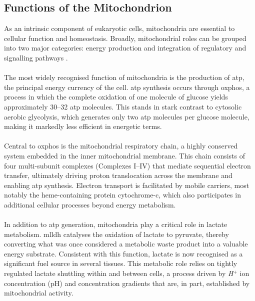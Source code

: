 \subsection{Functions of the Mitochondrion}

As an intrinsic component of eukaryotic cells, mitochondria are essential to cellular function and homeostasis. Broadly, mitochondrial roles can be grouped into two major categories: energy production and integration of regulatory and signalling pathways \cite{casanova_mitochondria_2023}.
\\
\\
The most widely recognised function of mitochondria is the production of \gls{atp}, the principal energy currency of the cell\cite{casanova_mitochondria_2023}. \gls{atp} synthesis occurs through \gls{oxphos}, a process in which the complete oxidation of one molecule of glucose yields approximately 30–32 \gls{atp} molecules\cite{casanova_mitochondria_2023, harrington_mitochondria_2023, andrieux_mitochondria_2021}. This stands in stark contrast to cytosolic aerobic glycolysis, which generates only two \gls{atp} molecules per glucose molecule, making it markedly less efficient in energetic terms\cite{casanova_mitochondria_2023}.
\\
\\
Central to \gls{oxphos} is the mitochondrial respiratory chain, a highly conserved system embedded in the inner mitochondrial membrane\cite{casanova_mitochondria_2023, andrieux_mitochondria_2021}. This chain consists of four multi-subunit complexes (Complexes I–IV) that mediate sequential electron transfer, ultimately driving proton translocation across the membrane and enabling \gls{atp} synthesis\cite{casanova_mitochondria_2023, andrieux_mitochondria_2021}. Electron transport is facilitated by mobile carriers, most notably the heme-containing protein cytochrome-c, which also participates in additional cellular processes beyond energy metabolism\cite{casanova_mitochondria_2023, harrington_mitochondria_2023, andrieux_mitochondria_2021}.
\\
\\
In addition to \gls{atp} generation, mitochondria play a critical role in lactate metabolism. \Gls{mlldh} catalyses the oxidation of lactate to pyruvate, thereby converting what was once considered a metabolic waste product into a valuable energy substrate\cite{casanova_mitochondria_2023, brooks_tracing_2022}. Consistent with this function, lactate is now recognised as a significant fuel source in several tissues\cite{casanova_mitochondria_2023, brooks_tracing_2022}. This metabolic role relies on tightly regulated lactate shuttling within and between cells, a process driven by \textit{H}$^+$ ion concentration (pH) and concentration gradients that are, in part, established by mitochondrial activity\cite{casanova_mitochondria_2023, payen_monocarboxylate_2020}.
